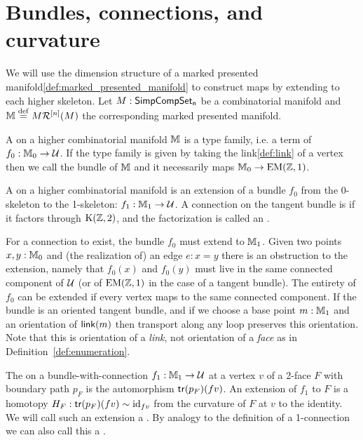 \section{Bundles, connections, and curvature}

We will use the dimension structure of a marked presented manifold\ref{def:marked_presented_manifold} to construct maps by extending to each higher skeleton. Let \( M:\mathsf{SimpCompSet_n} \) be a combinatorial manifold and \( \mathbb{M}\stackrel{\mathrm{def}}{=} M\mathcal{R}^{[n]}(M) \) the corresponding marked presented manifold.

\begin{mydef}
\label{def:bundle}
A  on a higher combinatorial manifold \( \mathbb{M} \) is a type family, i.e. a term of \( f_0:\mathbb{M}_0 \to \mathcal{U} \). If the type family is given by taking the link\ref{def:link} of a vertex then we call the bundle  of \( \mathbb{M} \) and it necessarily maps \( \mathbb{M}_0\to\mathrm{EM}(\mathbb{Z},1) \).
\end{mydef}

\begin{mydef}
\label{def:connection}
A  on a higher combinatorial manifold is an extension of a bundle \( f_0 \) from the 0-skeleton to the 1-skeleton: \( f_1:\mathbb{M}_1\to\mathcal{U} \). A connection on the tangent bundle is  if it factors through \( \mathrm{K}(\mathbb{Z},2) \), and the factorization is called an .
\end{mydef}

For a connection to exist, the bundle \( f_0 \) must extend to \( \mathbb{M}_1 \). Given two points \( x,y:\mathbb{M}_0 \) and (the realization of) an edge \( e:x=y \) there is an obstruction to the extension, namely that \( f_0(x) \) and \( f_0(y) \) must live in the same connected component of \( \mathcal{U} \) (or of \( \mathrm{EM}(\mathbb{Z},1) \) in the case of a tangent bundle). The entirety of \( f_0 \) can be extended if every vertex maps to the same connected component. If the bundle is an oriented tangent bundle, and if we choose a base point \( m:\mathbb{M}_1 \) and an orientation of \( \operatorname{\mathsf{link}}(m) \) then transport along any loop preserves this orientation. Note that this is orientation of a \emph{link}, not orientation of a \emph{face} as in Definition~\ref{def:enumeration}.

\begin{mydef}
\label{def:curvature}
The  on a bundle-with-connection \( f_1:\mathbb{M}_1\to\mathcal{U} \) at a vertex \( v \) of a 2-face \( F \) with boundary path \( p_F \) is the automorphism \( \mathsf{tr}(p_F)(fv) \). An extension of \( f_1 \) to \( F \) is a homotopy \( H_F:\mathsf{tr}(p_F)(fv)\sim\text{id}_{fv} \) from the curvature of \( F \) at \( v \) to the identity. We will call such an extension a . By analogy to the definition of a 1-connection we can also call this a .
\end{mydef}

